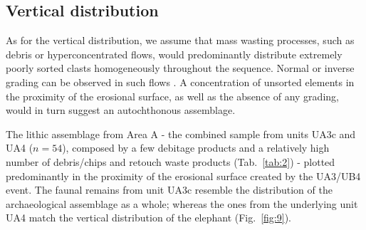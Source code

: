 \documentclass[preprint,authoryear,times]{elsarticle} %
\begin{document}
\subsection{Vertical distribution}




As for the vertical distribution, we assume that mass wasting processes, such as debris or hyperconcentrated flows, would predominantly distribute extremely poorly sorted clasts homogeneously throughout the sequence. Normal or inverse grading can be observed in such flows \citep{Pierson2005}. A concentration of unsorted elements in the proximity of the erosional surface, as well as the absence of any grading, would in turn suggest an autochthonous assemblage.


The lithic assemblage from Area A - the combined sample from units UA3c and UA4 ($n = 54$), composed by a few debitage products and a relatively high number of debris/chips and retouch waste products (Tab.~\ref{tab:2}) - plotted predominantly in the proximity of the erosional surface created by the UA3/UB4 event. The faunal remains from unit UA3c resemble the distribution of the archaeological assemblage as a whole; whereas the ones from the underlying unit UA4 match the vertical distribution of the elephant (Fig.~\ref{fig:9}).
\end{document}
